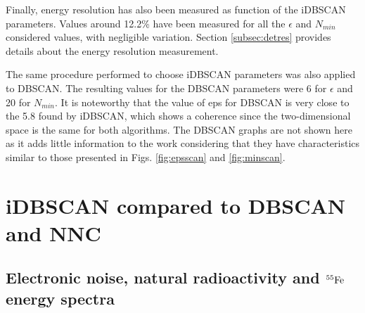 \documentclass[a4paper,11pt]{article}
\begin{document}
Finally, energy resolution has also been measured as function of the iDBSCAN parameters.
Values around 12.2\% have been measured for all the $\epsilon$ and $N_{min}$ considered values, with negligible variation. Section \ref{subsec:detres} provides details about the energy resolution measurement. 

\hspace{0pt}

The same procedure performed to choose iDBSCAN parameters was also applied to DBSCAN. The resulting values for the DBSCAN parameters were 6 for $\epsilon$ and 20 for $N_{min}$. It is noteworthy that the value of eps for DBSCAN is very close to the 5.8 found by iDBSCAN, which shows a coherence since the two-dimensional space is the same for both algorithms. The DBSCAN graphs are not shown here as it adds little information to the work considering that they have characteristics similar to those presented in Figs. \ref{fig:epsscan} and \ref{fig:minscan}.


\section{iDBSCAN compared to DBSCAN and NNC}
\label{sec:algoComp}


\subsection{Electronic noise, natural radioactivity and $\rm ^{55}Fe$ energy spectra}
\end{document}
